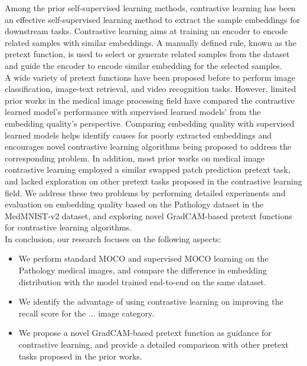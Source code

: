 \documentclass[12pt,twoside]{report}
\begin{document}
Among the prior self-supervised learning methods, contrastive learning has been an effective self-supervised learning method to extract the sample embeddings for downstream tasks. Contrastive learning aims at training an encoder to encode related samples with similar embeddings. A manually defined rule, known as the pretext function, is used to select or generate related samples from the dataset and guide the encoder to encode similar embedding for the selected samples. \\

A wide variety of pretext functions have been proposed before to perform image classification, image-text retrieval, and video recognition tasks. However, limited prior works in the medical image processing field have compared the contrastive learned model's performance with supervised learned models' from the embedding quality's perspective. Comparing embedding quality with supervised learned models helps identify causes for poorly extracted embeddings and encourages novel contrastive learning algorithms being proposed to address the corresponding problem. In addition, most prior works on medical image contrastive learning employed a similar swapped patch prediction pretext task, and lacked exploration on other pretext tasks proposed in the contrastive learning field. We address these two problems by performing detailed experiments and evaluation on embedding quality based on the Pathology dataset in the MedMNIST-v2 dataset, and exploring novel GradCAM-based pretext functions for contrastive learning algorithms. \\



In conclusion, our research focuses on the following aspects: 
\begin{itemize}
    \item We perform standard MOCO and supervised MOCO learning on the Pathology medical images, and compare the difference in embedding distribution with the model trained end-to-end on the same dataset. 
    \item We identify the advantage of using contrastive learning on improving the recall score for the ... image category. 
    \item We propose a novel GradCAM-based pretext function as guidance for contrastive learning, and provide a detailed comparison with other pretext tasks proposed in the prior works. 
\end{itemize}
\end{document}

